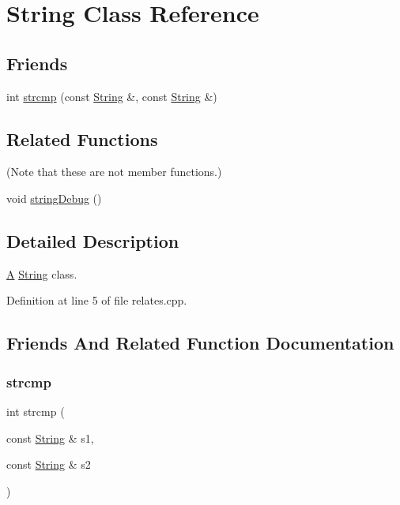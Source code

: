 \hypertarget{class_string}{}\section{String Class Reference}
\label{class_string}
\subsection*{Friends}
\begin{DoxyCompactItemize}
\item 
int \mbox{\hyperlink{class_string_ae3c243f0bc797b9e4b15d2ef5e5aaa7c}{strcmp}} (const \mbox{\hyperlink{class_string}{String}} \&, const \mbox{\hyperlink{class_string}{String}} \&)
\end{DoxyCompactItemize}
\subsection*{Related Functions}
(Note that these are not member functions.) \begin{DoxyCompactItemize}
\item 
void \mbox{\hyperlink{class_string_a5c07384b505d25ae6f61fc7abf0b0e61}{string\+Debug}} ()
\end{DoxyCompactItemize}


\subsection{Detailed Description}
\mbox{\hyperlink{class_a}{A}} \mbox{\hyperlink{class_string}{String}} class. 

Definition at line 5 of file relates.\+cpp.



\subsection{Friends And Related Function Documentation}
\mbox{\label{class_string_ae3c243f0bc797b9e4b15d2ef5e5aaa7c}} 
\subsubsection{\texorpdfstring{strcmp}{strcmp}}
{\footnotesize\ttfamily int strcmp (\begin{DoxyParamCaption}\item[{const \mbox{\hyperlink{class_string}{String}} \&}]{s1,  }\item[{const \mbox{\hyperlink{class_string}{String}} \&}]{s2 }\end{DoxyParamCaption})\hspace{0.3cm}{\ttfamily [friend]}}

